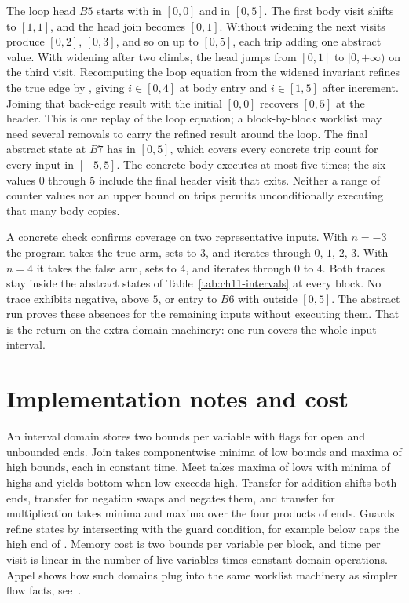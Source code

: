 The loop head $B5$ starts with  in $[0, 0]$ and  in $[0, 5]$.
The first body visit shifts  to $[1, 1]$, and the head join becomes $[0, 1]$.
Without widening the next visits produce $[0, 2]$, $[0, 3]$, and so on up to $[0, 5]$, each trip adding one abstract value.
With widening after two climbs, the head jumps from $[0, 1]$ to $[0, +\infty)$ on the third visit.
Recomputing the loop equation from the widened invariant refines the true edge by , giving $i\in[0,4]$ at body entry and $i\in[1,5]$ after increment.
Joining that back-edge result with the initial $[0,0]$ recovers $[0,5]$ at the header.
This is one replay of the loop equation; a block-by-block worklist may need several removals to carry the refined result around the loop.
The final abstract state at $B7$ has  in $[0, 5]$, which covers every concrete trip count for every input in $[-5, 5]$.
The concrete body executes at most five times; the six values $0$ through $5$ include the final header visit that exits.
Neither a range of counter values nor an upper bound on trips permits unconditionally executing that many body copies.

A concrete check confirms coverage on two representative inputs.
With $n = -3$ the program takes the true arm, sets  to $3$, and iterates  through $0$, $1$, $2$, $3$.
With $n = 4$ it takes the false arm, sets  to $4$, and iterates through $0$ to $4$.
Both traces stay inside the abstract states of Table~\ref{tab:ch11-intervals} at every block.
No trace exhibits  negative,  above $5$, or entry to $B6$ with  outside $[0, 5]$.
The abstract run proves these absences for the remaining inputs without executing them.
That is the return on the extra domain machinery: one run covers the whole input interval.

\section{Implementation notes and cost}
\label{sec:ch11-implementation}

An interval domain stores two bounds per variable with flags for open and unbounded ends.
Join takes componentwise minima of low bounds and maxima of high bounds, each in constant time.
Meet takes maxima of lows with minima of highs and yields bottom when low exceeds high.
Transfer for addition shifts both ends, transfer for negation swaps and negates them, and transfer for multiplication takes minima and maxima over the four products of ends.
Guards refine states by intersecting with the guard condition, for example  below  caps the high end of .
Memory cost is two bounds per variable per block, and time per visit is linear in the number of live variables times constant domain operations.
Appel shows how such domains plug into the same worklist machinery as simpler flow facts, see~\cite{appel-1998-modern}.

